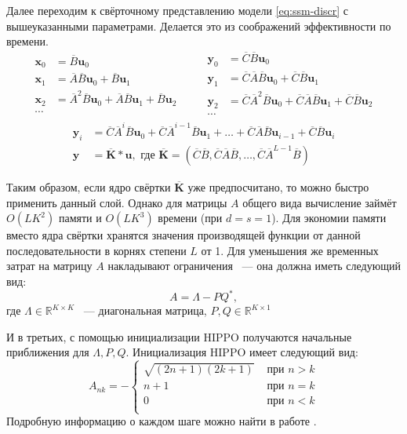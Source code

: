 \documentclass[a4paper, 12pt]{article}
\newcommand{\bx}{\mathbf{x}}
\newcommand{\by}{\mathbf{y}}
\newcommand{\bu}{\mathbf{u}}
\newcommand{\dR}{\mathds{R}}
\begin{document}
	Далее переходим к свёрточному представлению модели \ref{eq:ssm-discr} с вышеуказанными параметрами. Делается это из соображений эффективности по времени.
	\begin{equation*}
		\begin{split}
			\bx_0 &= \overline{B}\bu_0 \\
			\bx_1 &= \overline{A}\overline{B}\bu_0 + \overline{B}\bu_1 \\
			\bx_2 &= \overline{A}^2\overline{B}\bu_0 + \overline{A}\overline{B}\bu_1 + \overline{B}\bu_2 \\
			\cdots 
		\end{split}
		\qquad
		\begin{split}
			\by_0 &= \overline{C}\overline{B}\bu_0 \\
			\by_1 &= \overline{C}\overline{A}\overline{B}\bu_0 + \overline{C}\overline{B}\bu_1 \\
			\by_2 &= \overline{C}\overline{A}^2\overline{B}\bu_0 + \overline{C}\overline{A}\overline{B}\bu_1 + \overline{C}\overline{B}\bu_2 \\
			\cdots 
		\end{split}
	\end{equation*}
	\begin{equation*}
		\begin{split}
			\by_i &= \overline{C}\overline{A}^i\overline{B}\bu_0 + \overline{C}\overline{A}^{i-1}\overline{B}\bu_1 + \ldots + \overline{C}\overline{A}\overline{B}\bu_{i-1} + \overline{C}\overline{B}\bu_i \\
			\by &= \overline{\mathbf{K}} \ast \bu, \text{ где } \overline{\mathbf{K}} = (\overline{C}\overline{B}, \overline{C}\overline{A}\overline{B}, \ldots, \overline{C}\overline{A}^{L-1}\overline{B}) 
		\end{split}
	\end{equation*}

	Таким образом, если ядро свёртки $\overline{\mathbf{K}}$ уже предпосчитано, то можно быстро применить данный слой.
	Однако для матрицы $A$ общего вида вычисление займёт $O(LK^2)$ памяти и $O(LK^3)$ времени (при $d=s=1$).
	Для экономии памяти вместо ядра свёртки хранятся значения производящей функции от данной последовательности в корнях степени $L$ от 1.
	Для уменьшения же временных затрат на матрицу $A$ накладывают ограничения ~--- она должна иметь следующий вид:
	$$ A = \Lambda - PQ^*,$$
	где $\Lambda \in \dR^{K \times K}$ ~--- диагональная матрица, $P, Q \in \dR^{K \times 1}$
	
	И в третьих, с помощью инициализации HIPPO получаются начальные приближения для $\Lambda, P, Q$.
	Инициализация HIPPO имеет следующий вид:
	\begin{equation*}
		A_{nk} = -
		\begin{cases}
			\sqrt{(2n+1)(2k+1)} &\text{ при } n > k \\
			n+1 &\text{ при } n = k \\
			0 &\text{ при } n < k \\
		\end{cases}
	\end{equation*}
	Подробную информацию о каждом шаге можно найти в работе \citep{s4}.
	
\end{document}
